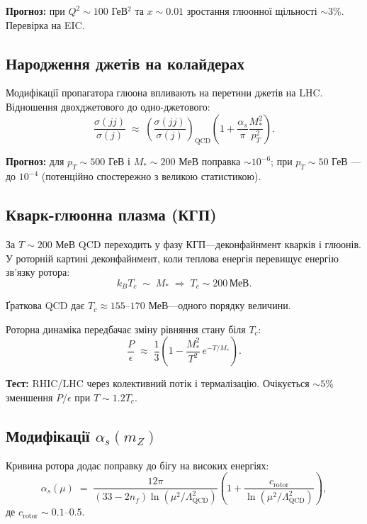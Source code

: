 \documentclass[11pt,a4paper]{article}
\theoremstyle{definition}
\theoremstyle{plain}
\theoremstyle{remark}
\begin{document}
\textbf{Прогноз:} при $Q^2\sim 100$ ГеВ$^2$ та $x\sim 0{.}01$ зростання глюонної щільності $\sim 3\%$. Перевірка на EIC.

\subsection{Народження джетів на колайдерах}

Модифікації пропагатора глюона впливають на перетини джетів на LHC. Відношення двохджетового до одно-джетового:
\begin{equation}
\frac{\sigma(jj)}{\sigma(j)} \;\approx\; \left(\frac{\sigma(jj)}{\sigma(j)}\right)_{\mathrm{QCD}}\left(1 + \frac{\alpha_s}{\pi}\frac{M_\ast^2}{p_T^2}\right).
\end{equation}

\textbf{Прогноз:} для $p_T\sim 500$ ГеВ і $M_\ast\sim 200$ МеВ поправка $\sim 10^{-6}$; при $p_T\sim 50$ ГеВ — до $10^{-4}$ (потенційно спостережно з великою статистикою).

\subsection{Кварк-глюонна плазма (КГП)}

За $T\sim 200$ МеВ QCD переходить у фазу КГП—деконфайнмент кварків і глюонів. У роторній картині деконфайнмент, коли теплова енергія перевищує енергію зв’язку ротора:
\begin{equation}
k_B T_c \;\sim\; M_\ast \;\Rightarrow\; T_c \sim 200\,\text{МеВ}.
\end{equation}

Ґраткова QCD дає $T_c\approx 155$–$170$ МеВ—одного порядку величини.

Роторна динаміка передбачає зміну рівняння стану біля $T_c$:
\begin{equation}
\frac{P}{\epsilon} \;\approx\; \frac{1}{3}\left(1 - \frac{M_\ast^2}{T^2}\,e^{-T/M_\ast}\right).
\end{equation}

\textbf{Тест:} RHIC/LHC через колективний потік і термалізацію. Очікується $\sim 5\%$ зменшення $P/\epsilon$ при $T\sim 1{.}2T_c$.

\subsection{Модифікації $\alpha_s(m_Z)$}

Кривина ротора додає поправку до бігу на високих енергіях:
\begin{equation}
\alpha_s(\mu) \;=\; \frac{12\pi}{(33-2n_f)\ln(\mu^2/\Lambda_{\mathrm{QCD}}^2)}\left(1 + \frac{c_{\mathrm{rotor}}}{\ln(\mu^2/\Lambda_{\mathrm{QCD}}^2)}\right),
\end{equation}
де $c_{\mathrm{rotor}}\sim 0{.}1$–$0{.}5$.
\end{document}
